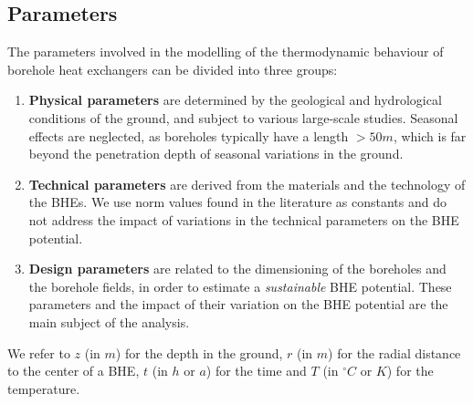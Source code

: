 \subsection{Parameters}
\label{geo_params}
The parameters involved in the modelling of the thermodynamic behaviour of borehole heat exchangers can be divided into three groups: 

\begin{enumerate}
\item \textbf{Physical parameters} are determined by the geological and hydrological conditions of the ground, and subject to various large-scale studies. Seasonal effects are neglected, as boreholes typically have a length $> 50m$, which is far beyond the penetration depth of seasonal variations in the ground.

\item \textbf{Technical parameters} are derived from the materials and the technology of the BHEs. We use norm values found in the literature as constants and do not address the impact of variations in the technical parameters on the BHE potential.

\item \textbf{Design parameters} are related to the dimensioning of the boreholes and the borehole fields, in order to estimate a \textit{sustainable} BHE potential. These parameters and the impact of their variation on the BHE potential are the main subject of the analysis. 
\end{enumerate}

We refer to $z$ (in $m$) for the depth in the ground, $r$ (in $m$) for the radial distance to the center of a BHE, $t$ (in $h$ or $a$) for the time and $T$ (in $^\circ C$ or $K$) for the temperature. 

